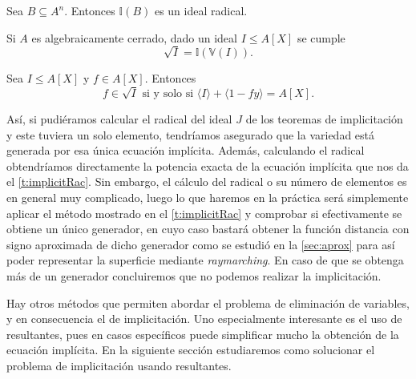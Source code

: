 \begin{proposicion}
    Sea $B\subseteq A^n$. Entonces $\mathbb{I}(B)$ es un ideal radical.
\end{proposicion}
\begin{teorema}
    Si $A$ es algebraicamente cerrado, dado un ideal $I\le A[X]$ se cumple
    \begin{equation*}
        \sqrt{I} = \mathbb{I}(\mathbb{V}(I)).
    \end{equation*}
\end{teorema}
\begin{proposicion}
    Sea $I\le A[X]$ y $f\in A[X]$. Entonces
    \begin{equation*}
        f\in \sqrt{I} \text{ si y solo si } \langle I \rangle + \langle 1-fy \rangle = A[X].
    \end{equation*}
\end{proposicion}
Así, si pudiéramos calcular el radical del ideal $J$ de los teoremas de implicitación y este tuviera un solo elemento, tendríamos asegurado que la variedad está generada por esa única ecuación implícita. Además, calculando el radical obtendríamos directamente la potencia exacta de la ecuación implícita que nos da el \autoref{t:implicitRac}. Sin embargo, el cálculo del radical o su número de elementos es en general muy complicado, luego lo que haremos en la práctica será simplemente aplicar el método mostrado en el \autoref{t:implicitRac} y comprobar si efectivamente se obtiene un único generador, en cuyo caso bastará obtener la función distancia con signo aproximada de dicho generador como se estudió en la \autoref{sec:aprox} para así poder representar la superficie mediante \textit{raymarching}. En caso de que se obtenga más de un generador concluiremos que no podemos realizar la implicitación.\newline

Hay otros métodos que permiten abordar el problema de eliminación de variables, y en consecuencia el de implicitación. Uno especialmente interesante es el uso de resultantes, pues en casos específicos puede simplificar mucho la obtención de la ecuación implícita. En la siguiente sección estudiaremos como solucionar el problema de implicitación usando resultantes.
